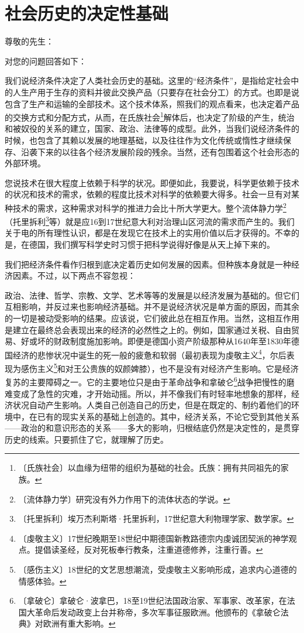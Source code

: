 \documentclass[12pt,UTF-8,openany]{ctexbook}
\begin{document}
\chapter{社会历史的决定性基础}

\begin{normalsize}
    
    \noindent 尊敬的先生：
    
    \vspace{24pt}
    
    对您的问题回答如下：
    
    我们说经济条件决定了人类社会历史的基础。这里的“经济条件”，是指给定社会中的人生产用于生存的资料并彼此交换产品（只要存在社会分工）的方式。也即是说包含了生产和运输的全部技术。这个技术体系，照我们的观点看来，也决定着产品的交换方式和分配方式，从而，在氏族社会\footnote{〔氏族社会〕以血缘为纽带的组织为基础的社会。氏族：拥有共同祖先的家族。}解体后，也决定了阶级的产生，统治和被奴役的关系的建立，国家、政治、法律等的成型。此外，当我们说经济条件的时候，也包含了其赖以发展的地理基础，以及往往作为文化传统或惰性才继续保存、沿袭下来的以往各个经济发展阶段的残余。当然，还有包围着这个社会形态的外部环境。
    
    您说技术在很大程度上依赖于科学的状况。即便如此，我要说，科学更依赖于技术的状况和技术的需求，依赖的程度比技术对科学的依赖要大得多。社会一旦有对某种技术的需求，这种需求对科学的推进力会比十所大学更大。整个流体静力学\footnote{〔流体静力学〕研究没有外力作用下的流体状态的学说。}（托里拆利\footnote{〔托里拆利〕埃万杰利斯塔·托里拆利，17世纪意大利物理学家、数学家。}等）就是应16到17世纪意大利对治理山区河流的需求而产生的。我们关于电的所有理性认识，都是在发现它在技术上的实用价值以后才获得的。不幸的是，在德国，我们撰写科学史时习惯于把科学说得好像是从天上掉下来的。
    
    我们把经济条件看作归根到底决定着历史如何发展的因素。但种族本身就是一种经济因素。不过，以下两点不容忽视：
    
    政治、法律、哲学、宗教、文学、艺术等等的发展是以经济发展为基础的。但它们互相影响，并反过来也影响经济基础。并不是说经济状况是单方面的原因，而其余的一切是被动受影响的结果。应该说，它们彼此总在相互作用。当然，这相互作用是建立在最终总会表现出来的经济的必然性之上的。例如，国家通过关税、自由贸易、好或坏的财政制度施加影响。即便是德国小资产阶级那种从1640年至1830年德国经济的悲惨状况中诞生的死一般的疲惫和软弱（最初表现为虔敬主义\footnote{〔虔敬主义〕17世纪晚期至18世纪中期德国新教路德宗内虔诚团契派的神学观点。提倡读圣经，反对死板奉行教条，注重道德修养，注重行善。}，尔后表现为感伤主义\footnote{〔感伤主义〕18世纪的文艺思想潮流，受虔敬主义影响形成，追求内心道德的情感体验。}和对王公贵族的奴颜婢膝），也不是没有对经济产生影响。它是经济复苏的主要障碍之一。它的主要地位只是由于革命战争和拿破仑\footnote{〔拿破仑〕拿破仑·波拿巴，18至19世纪法国政治家、军事家、改革家，在法国大革命后发动政变上台并称帝，多次军事征服欧洲。他颁布的《拿破仑法典》对欧洲有重大影响。}战争把慢性的磨难变成了急性的灾难，才开始动摇。所以，并不像我们有时轻率地想象的那样，经济状况自动产生影响。人类自己创造自己的历史，但是在既定的、制约着他们的环境中，在已有的现实关系的基础上创造的。其中，经济关系，不论它受到其他关系——政治的和意识形态的关系——多大的影响，归根结底仍然是决定性的，是贯穿历史的线索。只要抓住了它，就理解了历史。
    

\end{normalsize}
\end{document}

